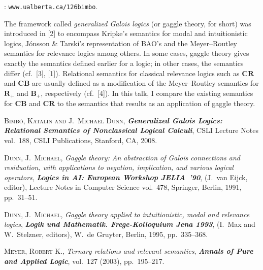 \documentclass[bsl,meeting]{asl}
\def\urladdr#1{\endgraf\noindent{\it URL Address}: {\tt #1}.}
\begin{document}
\thispagestyle{empty}

\urladdr{www.ualberta.ca/\char126bimbo}

The framework called \textit{generalized Galois logics} (or gaggle theory, 
for short) was introduced in [2] to encompass Kripke's semantics for modal 
and intuitionistic logics, J\'onsson \& Tarski's representation of BAO's
and the Meyer--Routley semantics for relevance logics among others.  In 
some cases, gaggle theory gives exactly the semantics defined earlier for 
a logic; in other cases, the semantics differ (cf.\ [3], [1]).  Relational
semantics for classical relevance logics such as $\mathbf{CR}$ and 
$\mathbf{CB}$ are usually defined as a modification of the Meyer--Routley 
semantics for $\mathbf{R}_+$ and $\mathbf{B}_+$, respectively (cf.\ [4]).  
In this talk, I compare the existing semantics for $\mathbf{CB}$ and 
$\mathbf{CR}$ to the semantics that results as an application of gaggle 
theory. 

\begin{thebibliography}{10}

{\scshape Bimb{\'o}, Katalin and J.~Michael Dunn},
{\bfseries\itshape Generalized Galois Logics: Relational Semantics of 
Nonclassical Logical Calculi}, CSLI Lecture Notes vol.~188, CSLI
Publications, Stanford, CA, 2008.

{\scshape Dunn, J.~Michael},
{\itshape Gaggle theory: An abstraction of Galois connections and residuation,
with applications to negation, implication, and various logical operators},
{\bfseries\itshape Logics in AI: European Workshop JELIA~'90},
(J.~van Eijck, editor), Lecture Notes in Computer Science vol.~478, 
Springer, Berlin, 1991, pp.~31--51.

{\scshape Dunn, J.~Michael},
{\itshape Gaggle theory applied to intuitionistic, modal and relevance
logics}, 
{\bfseries\itshape Logik und Mathematik. Frege-Kolloquium Jena 1993},
(I.~Max and W.~Stelzner, editors),
W.~de Gruyter, Berlin, 1995, pp.~335--368.

{\scshape Meyer, Robert K.},
{\itshape Ternary relations and relevant semantics},
{\bfseries\itshape Annals of Pure and Applied Logic},
vol.~127 (2003), pp.~195--217.

\end{thebibliography}

\vspace*{-0.5\baselineskip}
\end{document}
